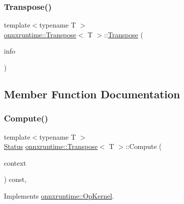 \subsubsection{\texorpdfstring{Transpose()}{Transpose()}}
{\footnotesize\ttfamily template$<$typename T $>$ \\
\mbox{\hyperlink{classonnxruntime_1_1Transpose}{onnxruntime\+::\+Transpose}}$<$ T $>$\+::\mbox{\hyperlink{classonnxruntime_1_1Transpose}{Transpose}} (\begin{DoxyParamCaption}\item[{const \mbox{\hyperlink{classonnxruntime_1_1OpKernelInfo}{Op\+Kernel\+Info}} \&}]{info }\end{DoxyParamCaption})\hspace{0.3cm}{\ttfamily [inline]}}



\subsection{Member Function Documentation}
\mbox{\label{classonnxruntime_1_1Transpose_ae4992515bde56895bc8c4641ec3d489b}} 
\subsubsection{\texorpdfstring{Compute()}{Compute()}\hspace{0.1cm}{\footnotesize\ttfamily [1/2]}}
{\footnotesize\ttfamily template$<$typename T $>$ \\
\mbox{\hyperlink{classonnxruntime_1_1common_1_1Status}{Status}} \mbox{\hyperlink{classonnxruntime_1_1Transpose}{onnxruntime\+::\+Transpose}}$<$ T $>$\+::Compute (\begin{DoxyParamCaption}\item[{\mbox{\hyperlink{classonnxruntime_1_1OpKernelContext}{Op\+Kernel\+Context}} $\ast$}]{context }\end{DoxyParamCaption}) const\hspace{0.3cm}{\ttfamily [override]}, {\ttfamily [virtual]}}



Implements \mbox{\hyperlink{classonnxruntime_1_1OpKernel_a9eca8656a78b1b3ab9d3351a12798650}{onnxruntime\+::\+Op\+Kernel}}.

\mbox{\label{classonnxruntime_1_1Transpose_abb0c686c43c09404457c66b123ceb951}} 
